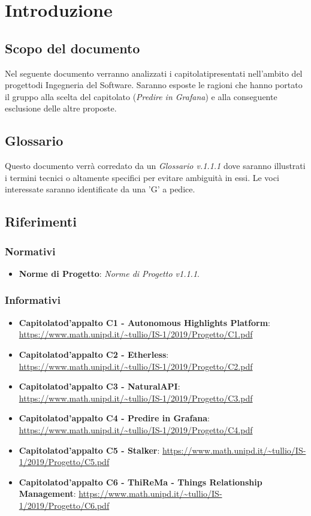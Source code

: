 \section{Introduzione}
\subsection{Scopo del documento}
    Nel seguente documento verranno analizzati i capitolati\glosp presentati nell'ambito del progetto\glosp di Ingegneria del Software. Saranno esposte le ragioni che hanno portato il gruppo alla scelta del capitolato (\textit{Predire in Grafana}) e alla conseguente esclusione delle altre proposte.
\subsection{Glossario}
    Questo documento verrà corredato da un \textit{Glossario v.1.1.1} dove saranno illustrati i termini tecnici o altamente specifici per evitare ambiguità in essi. Le voci interessate saranno identificate da una 'G' a pedice.
\subsection{Riferimenti}
\subsubsection{Normativi}
\begin{itemize}
	\item \textbf{Norme di Progetto}: \textit{Norme di Progetto v1.1.1}.
\end{itemize}
\subsubsection{Informativi}
\begin{itemize}
    \item \textbf{Capitolato}\glosp \textbf{d'appalto C1 - Autonomous Highlights Platform}:  \url{https://www.math.unipd.it/~tullio/IS-1/2019/Progetto/C1.pdf}
    \item \textbf{Capitolato}\glosp \textbf{d'appalto C2 - Etherless}:  \url{https://www.math.unipd.it/~tullio/IS-1/2019/Progetto/C2.pdf}
    \item \textbf{Capitolato}\glosp \textbf{d'appalto C3 - NaturalAPI}:  \url{https://www.math.unipd.it/~tullio/IS-1/2019/Progetto/C3.pdf}
    \item \textbf{Capitolato}\glosp \textbf{d'appalto C4 - Predire in Grafana}:  \url{https://www.math.unipd.it/~tullio/IS-1/2019/Progetto/C4.pdf}
    \item \textbf{Capitolato}\glosp \textbf{d'appalto C5 - Stalker}:  \url{https://www.math.unipd.it/~tullio/IS-1/2019/Progetto/C5.pdf}
    \item \textbf{Capitolato}\glosp \textbf{d'appalto C6 - ThiReMa - Things Relationship Management}: \url{https://www.math.unipd.it/~tullio/IS-1/2019/Progetto/C6.pdf}
\end{itemize}
